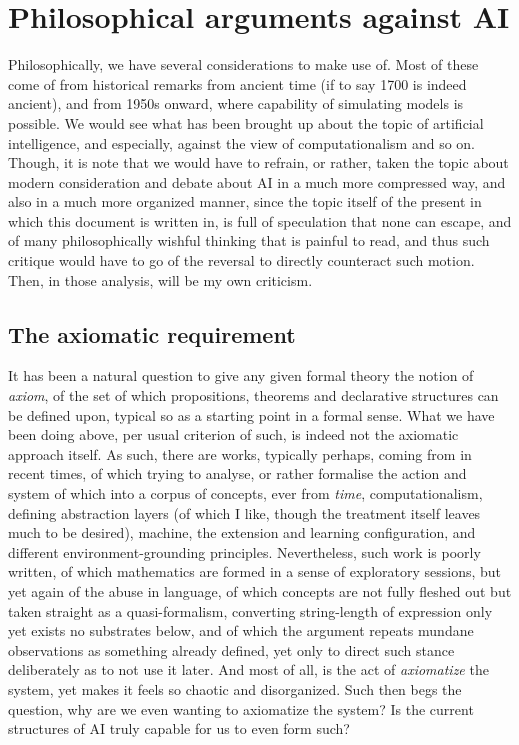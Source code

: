 \section{Philosophical arguments against AI}
Philosophically, we have several considerations to make use of. Most of these come of from historical remarks from ancient time (if to say 1700 is indeed ancient), and from 1950s onward, where capability of simulating models is possible. We would see what has been brought up about the topic of artificial intelligence, and especially, against the view of computationalism and so on. Though, it is note that we would have to refrain, or rather, taken the topic about modern consideration and debate about AI in a much more compressed way, and also in a much more organized manner, since the topic itself of the present in which this document is written in, is full of speculation that none can escape, and of many philosophically wishful thinking that is painful to read, and thus such critique would have to go of the reversal to directly counteract such motion. Then, in those analysis, will be my own criticism. 

\subsection{The axiomatic requirement}

It has been a natural question to give any given formal theory the notion of \textit{axiom}, of the set of which propositions, theorems and declarative structures can be defined upon, typical so as a starting point in a formal sense. What we have been doing above, per usual criterion of such, is indeed not the axiomatic approach itself. As such, there are works, typically perhaps, coming from \cite{bennett2025conscious} in recent times, of which trying to analyse, or rather formalise the action and system of which into a corpus of concepts, ever from \textit{time}, computationalism, defining abstraction layers (of which I like, though the treatment itself leaves much to be desired), machine, the extension and learning configuration, and different environment-grounding principles. Nevertheless, such work is poorly written, of which mathematics are formed in a sense of exploratory sessions, but yet again of the abuse in language, of which concepts are not fully fleshed out but taken straight as a quasi-formalism, converting string-length of expression only yet exists no substrates below, and of which the argument repeats mundane observations as something already defined, yet only to direct such stance deliberately as to not use it later. And most of all, is the act of \textit{axiomatize} the system, yet makes it feels so chaotic and disorganized. Such then begs the question, why are we even wanting to axiomatize the system? Is the current structures of AI truly capable for us to even form such? 

